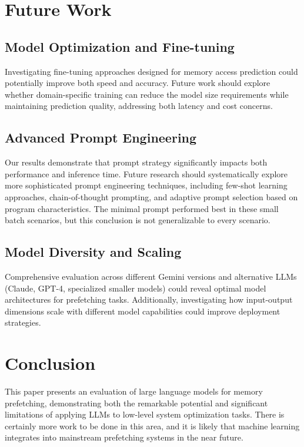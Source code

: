 \documentclass[sigconf,authorversion,nonacm]{acmart}
\begin{document}
\section{Future Work}
\label{sec:future}


\subsection{Model Optimization and Fine-tuning}
Investigating fine-tuning approaches designed for memory access prediction could potentially improve both speed and accuracy. Future work should explore whether domain-specific training can reduce the model size requirements while maintaining prediction quality, addressing both latency and cost concerns.

\subsection{Advanced Prompt Engineering}
Our results demonstrate that prompt strategy significantly impacts both performance and inference time. Future research should systematically explore more sophisticated prompt engineering techniques, including few-shot learning approaches, chain-of-thought prompting, and adaptive prompt selection based on program characteristics. The minimal prompt performed best in these small batch scenarios, but this conclusion is not generalizable to every scenario.

\subsection{Model Diversity and Scaling}
Comprehensive evaluation across different Gemini versions and alternative LLMs (Claude, GPT-4, specialized smaller models) could reveal optimal model architectures for prefetching tasks. Additionally, investigating how input-output dimensions scale with different model capabilities could improve deployment strategies.


\section{Conclusion}
\label{sec:conclusion}

This paper presents an evaluation of large language models for memory prefetching, demonstrating both the remarkable potential and significant limitations of applying LLMs to low-level system optimization tasks. There is certainly more work to be done in this area, and it is likely that machine learning integrates into mainstream prefetching systems in the near future.
\end{document}
